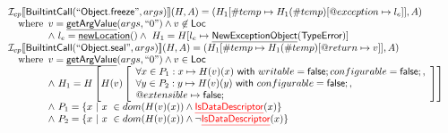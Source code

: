 \documentclass{article}
\makeatletter
\newcommand{\SF}[1]{\mbox{\textsf{#1}}}
\newcommand{\wherec}[1]{{\rm where}\begin{array}[t]{l}#1\end{array}}
\newcommand{\Loc}{\SF{Loc}}
\newcommand{\I}{\mathcal{I}}
\newcommand{\lbr}{\llbracket}
\newcommand{\rbr}{\rrbracket}
\newcommand{\hf}[1]{\underline{\sf #1}}
\newcommand{\varloc}[1]{\##1}
\newcommand{\varprop}[1]{@#1}
\newcommand{\rwith}{~{\sf with}~}
\def\inred{\color{red}}
\def\inred{\color{red}}
\makeatother
\begin{document}
\[\begin{array}{l}
\I _{cp}\lbr \SF{BuiltintCall}(``\SF{Object.freeze}",args)\rbr(H,A)
 = (H_1[\varloc{temp}\mapsto H_1(\varloc{temp})[\varprop{exception}\mapsto l_{e}]], A) \\
\quad\wherec{
  v = \hf{getArgValue}(args, ``0") \land v\not\in\Loc\\
  \land\ l_e = \hf{newLocation}() \land\ H_1=H[l_e\mapsto\hf{NewExceptionObject}(\SF{TypeError})] }\\
  
\I _{cp}\lbr \SF{BuiltintCall}(``\SF{Object.seal}",args)\rbr(H,A)
 = (H_1[\varloc{temp}\mapsto H_1(\varloc{temp})[\varprop{return}\mapsto v]], A) \\
\quad\wherec{
  v = \hf{getArgValue}(args, ``0") \land v  \in\Loc\\
  \land\ H_1 = H\left[ H(v)\left[
    \begin{array}{l}
      \forall x\in P_1 : x \mapsto H(v)(x)\rwith writable=\SF{false};configurable=\SF{false};, \\
      \forall y\in P_2 : y \mapsto H(v)(y)\rwith configurable=\SF{false};, \\
      \varprop{extensible} \mapsto \SF{false};
    \end{array}\right]\right]\\
  \land\ P_1 = \{ x\ |\ x\ \in dom(H(v)(x)) \land \hf{\inred IsDataDescriptor}(x) \} \\
  \land\ P_2 = \{ x\ |\ x\ \in dom(H(v)(x)) \land \neg\hf{\inred IsDataDescriptor}(x) \}
  }\\
\\\\

\end{array}
\]
\end{document}
